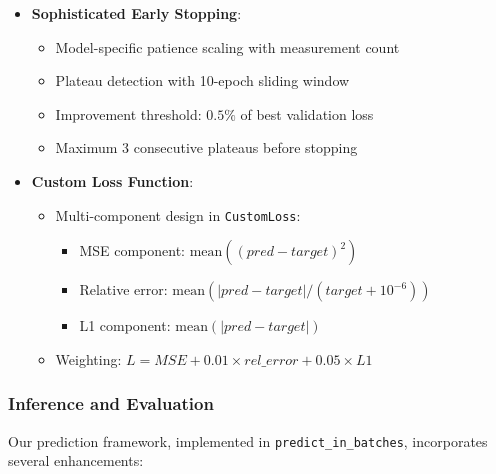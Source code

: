 \documentclass{optica-article}
\begin{document}
\begin{itemize}
\item \textbf{Sophisticated Early Stopping}:
\begin{itemize}
\item Model-specific patience scaling with measurement count
\item Plateau detection with 10-epoch sliding window
\item Improvement threshold: $0.5\%$ of best validation loss
\item Maximum 3 consecutive plateaus before stopping
\end{itemize}

\item \textbf{Custom Loss Function}:
\begin{itemize}
\item Multi-component design in \texttt{CustomLoss}:
\begin{itemize}
\item MSE component: $\text{mean}((pred - target)^2)$
\item Relative error: $\text{mean}(|pred - target|/(target + 10^{-6}))$
\item L1 component: $\text{mean}(|pred - target|)$
\end{itemize}
\item Weighting: $L = MSE + 0.01 \times rel\_error + 0.05 \times L1$
\end{itemize}
\end{itemize}

\subsubsection{Inference and Evaluation}

Our prediction framework, implemented in \texttt{predict\_in\_batches}, incorporates several enhancements:
\end{document}
